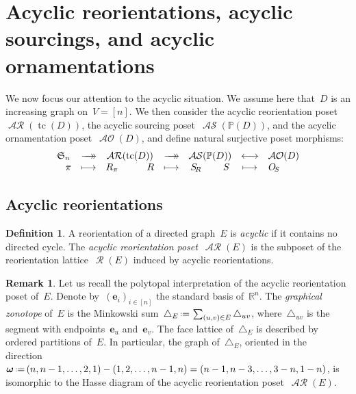\documentclass{amsart}
\theoremstyle{definition}
\newtheorem{definition}[theorem]{Definition}
\newtheorem{remark}[theorem]{Remark}
\newcommand{\R}{\mathbb{R}} %
\renewcommand{\b}[1]{\boldsymbol{#1}} %
\renewcommand{\c}[1]{\mathcal{#1}} %
\newcommand{\eqdef}{\mbox{\,\raisebox{0.2ex}{\scriptsize\ensuremath{\mathrm:}}\ensuremath{=}\,}} %
\newcommand{\simplex}{\triangle} %
\newcommand{\surjection}{\longrightarrow\mathrel{\mkern-22mu}\rightarrow\,}
\newcommand{\bijection}{\longleftrightarrow}
\DeclareMathOperator{\tc}{tc} %
\newcommand{\darkblue}{\color{darkblue}} %
\newcommand{\defn}[1]{\textsl{\darkblue #1}} %
\newcommand{\fS}{\mathfrak{S}} %
\DeclareMathOperator{\AOrn}{\c{AO}}  %
\DeclareMathOperator{\Reori}{\c{R}}  %
\DeclareMathOperator{\AReori}{\c{AR}}  %
\DeclareMathOperator{\ASour}{\mathcal{AS}}  %
\newcommand{\PP}{\mathbb P} %
\begin{document}

\section{Acyclic reorientations, acyclic sourcings, and acyclic ornamentations}
\label{sec:acyclic}

We now focus our attention to the acyclic situation.
We assume here that~$D$ is an increasing graph on~$V = [n]$.
We then consider the acyclic reorientation poset~$\AReori(\tc(D))$, the acyclic sourcing poset~$\ASour(\PP(D))$, and the acyclic ornamentation poset~$\AOrn(D)$, and define natural surjective poset morphisms:
\[
\begin{array}{ccccccc}
	\fS_n & \surjection & \AReori(\tc(D)) & \surjection & \ASour(\PP(D)) & \bijection & \AOrn(D) \\
	\quad\pi & \longmapsto & R_\pi \qquad\quad R & \longmapsto & S_{\!R} \qquad\; S & \longmapsto & O_{\!S} \qquad
\end{array}
\]

\subsection{Acyclic reorientations}

\begin{definition}
A reorientation of a directed graph~$E$ is \defn{acyclic} if it contains no directed cycle.
The \defn{acyclic reorientation poset}~$\AReori(E)$ is the subposet of the reorientation lattice~$\Reori(E)$ induced by acyclic reorientations.
\end{definition}

\begin{remark}
Let us recall the polytopal interpretation of the acyclic reorientation poset of~$E$.
Denote by~$(\b{e}_i)_{i \in [n]}$ the standard basis of~$\R^n$.
The \defn{graphical zonotope} of~$E$ is the Minkowski sum~$\simplex_E \eqdef \sum_{(u,v) \in E} \simplex_{uv}$, where~$\simplex_{uv}$ is the segment with endpoints~$\b{e}_u$ and~$\b{e}_v$.
The face lattice of~$\simplex_E$ is described by ordered partitions of~$E$.
In particular, the graph of~$\simplex_E$, oriented in the direction~$\b{\omega} \eqdef (n, n-1, \dots, 2, 1) - (1, 2, \dots, n-1, n) = (n-1, n-3, \dots, 3-n, 1-n)$, is isomorphic to the Hasse diagram of the acyclic reorientation poset~$\AReori(E)$.
\end{remark}
\end{document}
